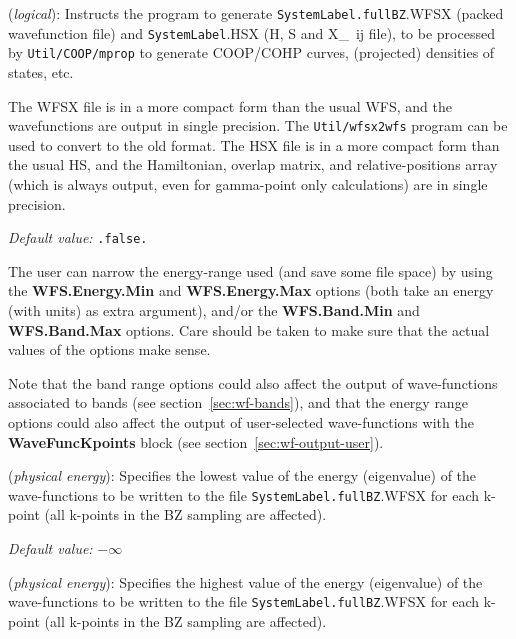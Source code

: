 \begin{description}
\itemsep 10pt
\parsep 0pt

\item[\textbf{COOP.Write}] (\textit{logical}):
Instructs the program to generate  \texttt{SystemLabel.fullBZ}.WFSX (packed
wavefunction file) and  \texttt{SystemLabel}.HSX (H, S and X\_~{ij} file),
to be processed by \texttt{Util/COOP/mprop} to generate COOP/COHP curves,
(projected) densities of states, etc.

The WFSX file is in a more compact form than the usual WFS, and the
wavefunctions are output in single precision. The \texttt{Util/wfsx2wfs}
program can be used to convert to the old format.
The HSX file is in a more compact form than the usual HS, and the
Hamiltonian, overlap matrix, and relative-positions array (which is
always output, even for gamma-point only calculations) are in
single precision.

\textit{Default value:} \texttt{.false.}

The user can narrow the energy-range used (and save some file space)
by using the \textbf{WFS.Energy.Min} and \textbf{WFS.Energy.Max} options (both take an
energy (with units) as extra argument), and/or the \textbf{WFS.Band.Min} and
\textbf{WFS.Band.Max} options. Care should be taken to make sure that the 
actual values of the options make sense.

Note that the band range options could also affect the output of
wave-functions associated to bands (see section~\ref{sec:wf-bands}),
and that the energy range options could also affect the output of
user-selected wave-functions with the \textbf{WaveFuncKpoints} block (see
section~\ref{sec:wf-output-user}).

\item[\textbf{WFS.Energy.Min}] (\textit{physical energy}):
Specifies the lowest value of the energy (eigenvalue) of the wave-functions to be written to 
the file \texttt{SystemLabel.fullBZ}.WFSX for each k-point (all k-points
in the BZ sampling are affected). 

\textit{Default value:} $-\infty$

\item[\textbf{WFS.Energy.Max}] (\textit{physical energy}):
Specifies the highest value of the energy (eigenvalue) of the wave-functions to be written to 
the file \texttt{SystemLabel.fullBZ}.WFSX for each k-point (all k-points
in the BZ sampling are affected).


\end{description}
